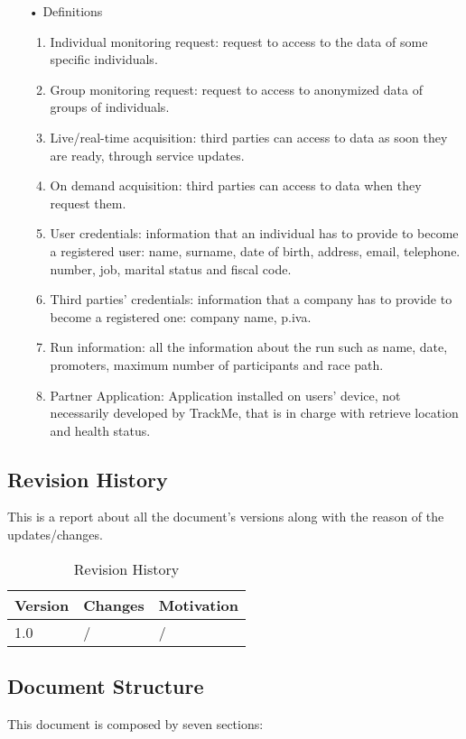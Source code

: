 \begin{enumerate}
\item[•] {\Large Definitions}
	\begin{enumerate}
		\item Individual monitoring request: request to access to the data of some specific  individuals.
		\item Group monitoring request: request to access to anonymized data of groups of individuals.
		\item Live/real-time acquisition: third parties can access to data as soon they are ready, 				through service updates.
		\item On demand acquisition: third parties can access to data when they request 				them.
		\item User credentials: information that an individual has to provide to become a 				registered user: name, surname, date of birth, address, email, telephone.
			number, job, marital status and fiscal code. 
		\item Third parties' credentials: information that a company has to provide to 					become a registered one: company name, p.iva.
		\item Run information: all the information about the run such as name, date, promoters, 				maximum number of participants and race path.
		\item Partner Application: Application installed on users' device, not necessarily developed by TrackMe, that is in charge with retrieve location and health status. 
	\end{enumerate}
\end{enumerate}

\subsection{Revision History}
This is a report about all the document's versions along with the reason of the updates/changes.

\begin{table}[h]
\centering
\begin{tabular}{|l|p{}|p{}|}
\hline
Version & Changes & Motivation\\ \hline
1.0     & / & / \\ \hline
\end{tabular}
\caption{Revision History}
\end{table}

\clearpage
\subsection{Document Structure}
This document is composed by seven sections:

